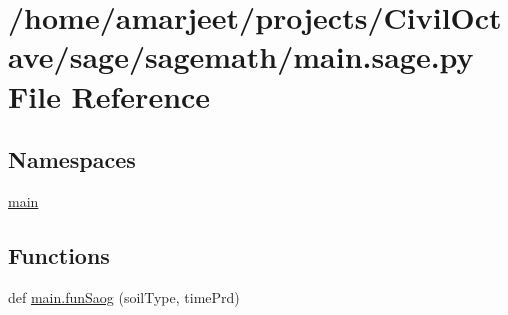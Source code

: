 \hypertarget{a00027}{}\section{/home/amarjeet/projects/\+Civil\+Octave/sage/sagemath/main.sage.\+py File Reference}
\label{a00027}
\subsection*{Namespaces}
\begin{DoxyCompactItemize}
\item 
 \hyperlink{a00039}{main}
\end{DoxyCompactItemize}
\subsection*{Functions}
\begin{DoxyCompactItemize}
\item 
def \hyperlink{a00039_a4f60afd2426ee9409955e4352b3f0486}{main.\+fun\+Saog} (soil\+Type, time\+Prd)
\end{DoxyCompactItemize}

